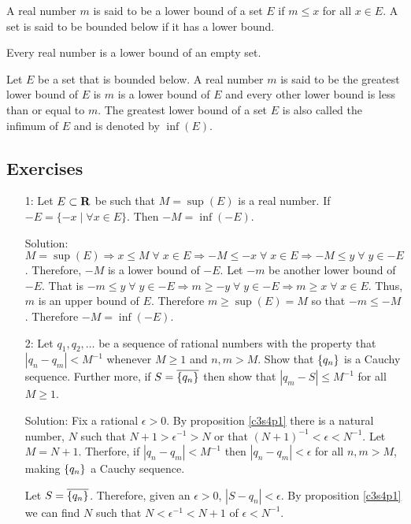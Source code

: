 \begin{defn}\label{c4s5d3}
A real number $m$ is said to be a lower bound of a set $E$ if $m \le x$
for all $x \in E$. A set is said to be bounded below if it has a lower 
bound.
\end{defn}

\begin{rem}
Every real number is a lower bound of an empty set.
\end{rem}

\begin{defn}\label{c4s5d4}
Let $E$ be a set that is bounded below. A real number $m$ is said to be
the greatest lower bound of $E$ is $m$ is a lower bound of $E$ and every
other lower bound is less than or equal to $m$. The greatest lower bound
of a set $E$ is also called the infimum of $E$ and is denoted by $\inf(E)$.
\end{defn}

\subsection{Exercises}
\begin{enumerate}
\item[1:] Let $E \subset \mathbf{R}$ be such that $M = \sup(E)$ is a real 
number. If $-E = \{-x \;|\; \forall x  \in E\}$. Then $-M = \inf(-E)$.
\item[Solution:] $M = \sup(E) \Rightarrow x \le M \;\forall\; x \in E
\Rightarrow -M \le -x \;\forall\; x \in E \Rightarrow -M \le y \;\forall\;
y \in -E$. Therefore, $-M$ is a lower bound of $-E$. Let $-m$ be another
lower bound of $-E$. That is $-m \le y \;\forall\; y \in -E \Rightarrow
m \ge -y \;\forall\; y \in -E \Rightarrow m \ge x \;\forall\; x \in E$.
Thus, $m$ is an upper bound of $E$. Therefore $m \ge \sup(E) = M$ so that
$-m \le -M$. Therefore $-M = \inf(-E)$.

\item[2:] Let $q_1, q_2, \ldots$ be a sequence of rational numbers with
the property that $|q_n - q_m| < M^{-1}$ whenever $M \ge 1$ and $n, m > M$.
Show that $\{q_n\}$ is a Cauchy sequence. Further more, if $S = 
\overline{\{q_n\}}$ then show that $|q_m - S| \le M^{-1}$ for all
$M \ge 1$.
\item[Solution:] Fix a rational $\epsilon > 0$. By proposition \ref{c3s4p1}
there is a natural number, $N$ such that $N + 1 > \epsilon^{-1} > N$ or 
that $(N+1)^{-1} < \epsilon < N^{-1}$. Let $M = N+1$. Therfore, if 
$|q_n - q_m| < M^{-1}$ then $|q_n - q_m| < \epsilon$ for all $n, m > M$,
making $\{q_n\}$ a Cauchy sequence.

Let $S = \overline{\{q_n\}}$. Therefore, given an $\epsilon > 0$, $|
S - q_n| < \epsilon$. By proposition \ref{c3s4p1} we can find $N$ such that
$N < \epsilon^{-1} < N + 1$ of $\epsilon < N^{-1}$.
\end{enumerate}
